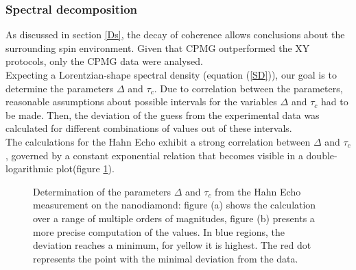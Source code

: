 \documentclass[12pt,a4paper]{article}
\begin{document}
\subsubsection{Spectral decomposition}
As discussed in section \ref{Ds}, the decay of coherence allows conclusions about the surrounding spin environment. Given that CPMG outperformed the XY protocols, only the CPMG data were analysed.\\
Expecting a Lorentzian-shape spectral density (equation (\ref{SD})), our goal is to determine the parameters $\Delta$ and $\tau_c$.
Due to correlation between the parameters, reasonable assumptions about possible intervals for the variables $\Delta$ and $\tau_c$ had to be made\cite{ssbd}. Then, the deviation of the guess from the experimental data was calculated for different combinations of values out of these intervals.\\
The calculations for the Hahn Echo exhibit a strong correlation between $\Delta$ and $\tau_c$, governed by a constant exponential relation that becomes visible in a double-logarithmic plot(figure \ref{H}).
\begin{figure}[H]
    \caption{Determination of the parameters $\Delta$ and $\tau_c$ from the Hahn Echo measurement on the nanodiamond: figure (a) shows the calculation over a range of multiple orders of magnitudes, figure (b) presents a more precise computation of the values. In blue regions, the deviation reaches a minimum, for yellow it is highest. The red dot represents the point with the minimal deviation from the data.}
\label{H} 
\end{figure}
\end{document}
